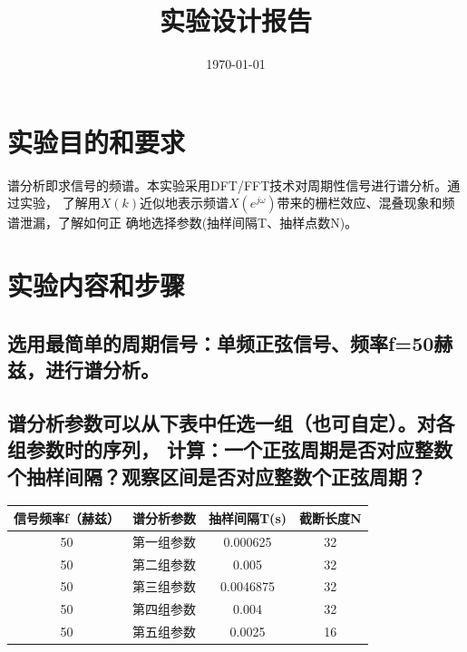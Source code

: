 \documentclass{../source/zjureport}
\title{实验设计报告}
\date{\today}
\begin{document}
    \makeheader
    \section{实验目的和要求}
    谱分析即求信号的频谱。本实验采用DFT/FFT技术对周期性信号进行谱分析。通过实验，
    了解用$X(k)$近似地表示频谱$X(e^{j\omega})$带来的栅栏效应、混叠现象和频谱泄漏，了解如何正
    确地选择参数(抽样间隔T、抽样点数N)。

    \section{实验内容和步骤}
        \subsection{选用最简单的周期信号：单频正弦信号、频率f=50赫兹，进行谱分析。}
        \subsection{谱分析参数可以从下表中任选一组（也可自定）。对各组参数时的序列，
        计算：一个正弦周期是否对应整数个抽样间隔？观察区间是否对应整数个正弦周期？}

        \begin{table}[H]
            \centering
            \begin{tabular}{|c|c|c|c|}
            \hline
            \multicolumn{1}{|l|}{\textbf{信号频率f（赫兹）}} & \multicolumn{1}{l|}{\textbf{谱分析参数}} & \multicolumn{1}{l|}{\textbf{抽样间隔T(s)}} & \multicolumn{1}{l|}{\textbf{截断长度N}} \\ \hline
            50                                       & 第一组参数                               & 0.000625                               & 32                                  \\ \hline
            50                                       & 第二组参数                               & 0.005                                  & 32                                  \\ \hline
            50                                       & 第三组参数                               & 0.0046875                              & 32                                  \\ \hline
            50                                       & 第四组参数                               & 0.004                                  & 32                                  \\ \hline
            50                                       & 第五组参数                               & 0.0025                                 & 16                                  \\ \hline
            \end{tabular}
            \end{table}
\end{document}

